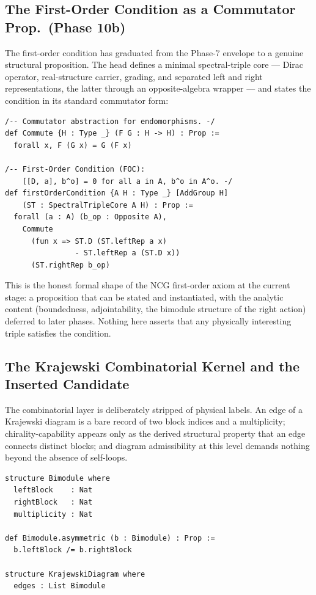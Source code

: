 \documentclass[12pt,a4paper,twoside]{article}
\theoremstyle{plain}
\theoremstyle{definition}
\theoremstyle{remark}
\begin{document}
\subsection{The First-Order Condition as a Commutator Prop.\ (Phase 10b)}
\label{subsec:foc}

The first-order condition has graduated from the Phase-7 envelope to a
genuine structural proposition. The head defines a minimal spectral-triple
core --- Dirac operator, real-structure carrier, grading, and separated
left and right representations, the latter through an opposite-algebra
wrapper --- and states the condition in its standard commutator form:

\begin{lstlisting}
/-- Commutator abstraction for endomorphisms. -/
def Commute {H : Type _} (F G : H -> H) : Prop :=
  forall x, F (G x) = G (F x)

/-- First-Order Condition (FOC):
    [[D, a], b^o] = 0 for all a in A, b^o in A^o. -/
def firstOrderCondition {A H : Type _} [AddGroup H]
    (ST : SpectralTripleCore A H) : Prop :=
  forall (a : A) (b_op : Opposite A),
    Commute
      (fun x => ST.D (ST.leftRep a x)
                - ST.leftRep a (ST.D x))
      (ST.rightRep b_op)
\end{lstlisting}

This is the honest formal shape of the NCG first-order axiom at the
current stage: a proposition that can be stated and instantiated, with the
analytic content (boundedness, adjointability, the bimodule structure of
the right action) deferred to later phases. Nothing here asserts that any
physically interesting triple satisfies the condition.

\subsection{The Krajewski Combinatorial Kernel and the Inserted Candidate}
\label{subsec:krajewski}

The combinatorial layer is deliberately stripped of physical labels. An
edge of a Krajewski diagram is a bare record of two block indices and a
multiplicity; chirality-capability appears only as the derived structural
property that an edge connects distinct blocks; and diagram admissibility
at this level demands nothing beyond the absence of self-loops.

\begin{lstlisting}
structure Bimodule where
  leftBlock    : Nat
  rightBlock   : Nat
  multiplicity : Nat

def Bimodule.asymmetric (b : Bimodule) : Prop :=
  b.leftBlock /= b.rightBlock

structure KrajewskiDiagram where
  edges : List Bimodule
\end{lstlisting}
\end{document}
